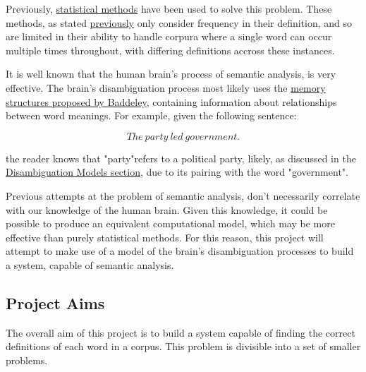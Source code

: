 \documentclass[]{article}
\begin{document}
Previously, \hyperref[sec:LSA]{statistical methods} have been used to solve this problem. These methods, as stated \hyperref[sec:LSA]{previously} only consider frequency in their definition, and so are limited in their ability to handle corpura where a single word can occur multiple times throughout, with differing definitions accross these instances.

It is well known that the human brain's process of semantic analysis, is very effective. The brain's disambiguation process most likely uses the \hyperref[LongTerm]{memory structures proposed by Baddeley}\cite{MemoryBaddeleyEysenkAnderson}, containing information about relationships between word meanings. For example, given the following sentence:

\[The\: party\: led\: government.\]

the reader knows that "party"refers to a political party, likely, as discussed in the \hyperref[sec:DisambiguationModels]{Disambiguation Models section}, due to its pairing with the word "government".

Previous attempts at the problem of semantic analysis, don't necessarily correlate with our knowledge of the human brain. Given this knowledge, it could be possible to produce an equivalent computational model, which may be more effective than purely statistical methods. For this reason, this project will attempt to make use of a model of the brain's disambiguation processes to build a system, capable of semantic analysis.

\subsection{Project Aims}
\label{sec:ProjectAim}
The overall aim of this project is to build a system capable of finding the correct definitions of each word in a corpus. This problem is divisible into a set of smaller problems. 
\end{document}
